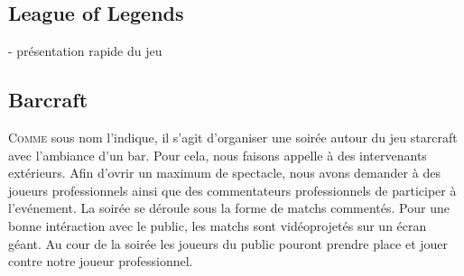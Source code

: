 
\subsection{League of Legends}%
\label{sub:league_of_legends}

- présentation rapide du jeu

\subsection{Barcraft}%
\label{sub:barcraft}

\lettrine{C}{omme} sous nom l'indique, il s'agit d'organiser une soirée autour
du jeu starcraft avec l'ambiance d'un bar.	Pour cela, nous faisons
appelle à des intervenants extérieurs. Afin d'ovrir un maximum de
spectacle, nous avons demander à des joueurs professionnels ainsi
que des commentateurs professionnels de participer à l'evénement.
La soirée se déroule sous la forme de matchs commentés. Pour une
bonne intéraction avec le public, les matchs sont vidéoprojetés sur
un écran géant. Au cour de la soirée les joueurs du public pouront
prendre place et jouer contre notre joueur professionnel.

